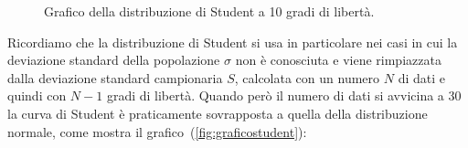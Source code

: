 \documentclass[onecolumn,12pt]{book}\usepackage[]{graphicx}\usepackage[]{color}
\newenvironment{knitrout}{}{} %
\begin{document}
\begin{figure}[H]
\begin{center}
\begin{knitrout}
{}



\end{knitrout}
\caption{Grafico della distribuzione di Student a 10 gradi di libert\`a. }
\label{fig:graficostudent1}
\end{center}
\end{figure}
Ricordiamo che la distribuzione di Student si usa in  particolare nei casi in cui la deviazione standard della popolazione $\sigma$  non \`e conosciuta e viene rimpiazzata  dalla deviazione standard campionaria  $S$, calcolata con un numero $N$ di dati e quindi con $N-1$ gradi di libert\`a. Quando per\`o il numero di dati si avvicina a 30 la curva di Student \`e praticamente sovrapposta a quella della distribuzione normale, come mostra il grafico~(\ref{fig:graficostudent}):
\end{document}
